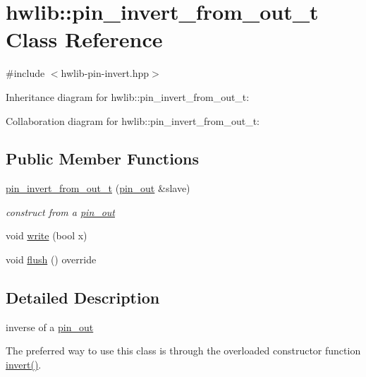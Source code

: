 \hypertarget{classhwlib_1_1pin__invert__from__out__t}{}\section{hwlib\+:\+:pin\+\_\+invert\+\_\+from\+\_\+out\+\_\+t Class Reference}
\label{classhwlib_1_1pin__invert__from__out__t}


{\ttfamily \#include $<$hwlib-\/pin-\/invert.\+hpp$>$}



Inheritance diagram for hwlib\+:\+:pin\+\_\+invert\+\_\+from\+\_\+out\+\_\+t\+:


Collaboration diagram for hwlib\+:\+:pin\+\_\+invert\+\_\+from\+\_\+out\+\_\+t\+:
\subsection*{Public Member Functions}
\begin{DoxyCompactItemize}
\item 
\mbox{\label{classhwlib_1_1pin__invert__from__out__t_a307bf035833ce94e05a93efcd9f7bd10}} 
\hyperlink{classhwlib_1_1pin__invert__from__out__t_a307bf035833ce94e05a93efcd9f7bd10}{pin\+\_\+invert\+\_\+from\+\_\+out\+\_\+t} (\hyperlink{classhwlib_1_1pin__out}{pin\+\_\+out} \&slave)
\begin{DoxyCompactList}\small\item\em construct from a \hyperlink{classhwlib_1_1pin__out}{pin\+\_\+out} \end{DoxyCompactList}\item 
void \hyperlink{classhwlib_1_1pin__invert__from__out__t_a0b069e2298848bd45ff1cc302d811e53}{write} (bool x)
\item 
void \hyperlink{classhwlib_1_1pin__invert__from__out__t_acb6c624010c503c5703c7fb7ec771619}{flush} () override
\end{DoxyCompactItemize}


\subsection{Detailed Description}
inverse of a \hyperlink{classhwlib_1_1pin__out}{pin\+\_\+out}

The preferred way to use this class is through the overloaded constructor function \hyperlink{namespacehwlib_ab619d7f70bb62112b2a04192f5103a24}{invert()}. 

